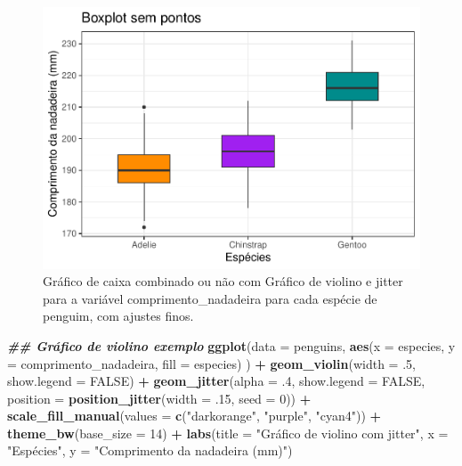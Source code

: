 \documentclass[
]{article}
\newenvironment{Shaded}{\begin{snugshade}}{\end{snugshade}}
\newcommand{\AttributeTok}[1]{\textcolor[rgb]{0.13,0.29,0.53}{#1}}
\newcommand{\ConstantTok}[1]{\textcolor[rgb]{0.56,0.35,0.01}{#1}}
\newcommand{\DecValTok}[1]{\textcolor[rgb]{0.00,0.00,0.81}{#1}}
\newcommand{\DocumentationTok}[1]{\textcolor[rgb]{0.56,0.35,0.01}{\textbf{\textit{#1}}}}
\newcommand{\FunctionTok}[1]{\textcolor[rgb]{0.13,0.29,0.53}{\textbf{#1}}}
\newcommand{\NormalTok}[1]{#1}
\newcommand{\SpecialCharTok}[1]{\textcolor[rgb]{0.81,0.36,0.00}{\textbf{#1}}}
\newcommand{\StringTok}[1]{\textcolor[rgb]{0.31,0.60,0.02}{#1}}
\begin{document}
\begin{figure}
\centering
\includegraphics{epr_files/figure-latex/fig-boxplot-violin-fino-1.pdf}
\caption{\label{fig:fig-boxplot-violin-fino-1}Gráfico de caixa combinado ou não com Gráfico de violino e jitter para a variável comprimento\_nadadeira para cada espécie de penguim, com ajustes finos.}
\end{figure}

\begin{Shaded}
\begin{Highlighting}[]
\DocumentationTok{\#\# Gráfico de violino exemplo}
\FunctionTok{ggplot}\NormalTok{(}\AttributeTok{data =}\NormalTok{ penguins, }
       \FunctionTok{aes}\NormalTok{(}\AttributeTok{x =}\NormalTok{ especies, }\AttributeTok{y =}\NormalTok{ comprimento\_nadadeira, }\AttributeTok{fill =}\NormalTok{ especies)}
\NormalTok{       ) }\SpecialCharTok{+}
    \FunctionTok{geom\_violin}\NormalTok{(}\AttributeTok{width =}\NormalTok{ .}\DecValTok{5}\NormalTok{, }\AttributeTok{show.legend =} \ConstantTok{FALSE}\NormalTok{) }\SpecialCharTok{+}
    \FunctionTok{geom\_jitter}\NormalTok{(}\AttributeTok{alpha =}\NormalTok{ .}\DecValTok{4}\NormalTok{, }\AttributeTok{show.legend =} \ConstantTok{FALSE}\NormalTok{, }
                \AttributeTok{position =} \FunctionTok{position\_jitter}\NormalTok{(}\AttributeTok{width =}\NormalTok{ .}\DecValTok{15}\NormalTok{, }\AttributeTok{seed =} \DecValTok{0}\NormalTok{)) }\SpecialCharTok{+}
    \FunctionTok{scale\_fill\_manual}\NormalTok{(}\AttributeTok{values =} \FunctionTok{c}\NormalTok{(}\StringTok{"darkorange"}\NormalTok{, }\StringTok{"purple"}\NormalTok{, }\StringTok{"cyan4"}\NormalTok{)) }\SpecialCharTok{+}
    \FunctionTok{theme\_bw}\NormalTok{(}\AttributeTok{base\_size =} \DecValTok{14}\NormalTok{) }\SpecialCharTok{+}
    \FunctionTok{labs}\NormalTok{(}\AttributeTok{title =} \StringTok{"Gráfico de violino com jitter"}\NormalTok{, }\AttributeTok{x =} \StringTok{"Espécies"}\NormalTok{, }\AttributeTok{y =} \StringTok{"Comprimento da nadadeira (mm)"}\NormalTok{)}
\end{Highlighting}
\end{Shaded}
\end{document}
